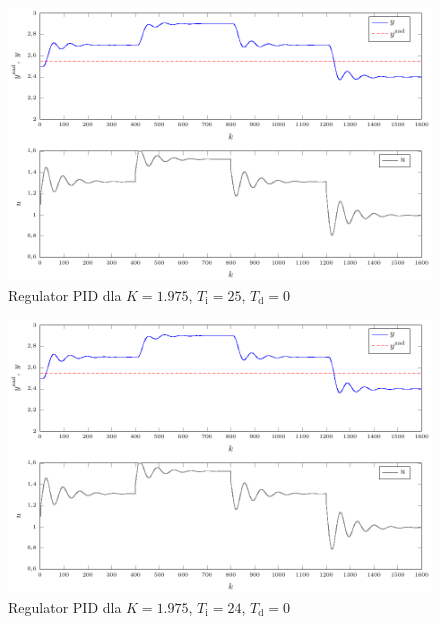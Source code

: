 \begin{figure}[tb] 
\centering 
\includegraphics[scale=1]{rysunki/zapisz_pdf/PID_K=1.975_Ti=25.00_Td=0.00.pdf} 
\caption{Regulator PID dla $K=\num{1.975}$, $T_{\mathrm{i}}=25$, $T_{\mathrm{d}}=0$} 
\label{r_pgfplots_PID_K=1.975_Ti=25.00_Td=0.00} 
\end{figure}

\begin{figure}[tb] 
\centering 
\includegraphics[scale=1]{rysunki/zapisz_pdf/PID_K=1.975_Ti=24.00_Td=0.00.pdf} 
\caption{Regulator PID dla $K=\num{1.975}$, $T_{\mathrm{i}}=24$, $T_{\mathrm{d}}=0$} 
\label{r_pgfplots_PID_K=1.975_Ti=24.00_Td=0.00} 
\end{figure}

